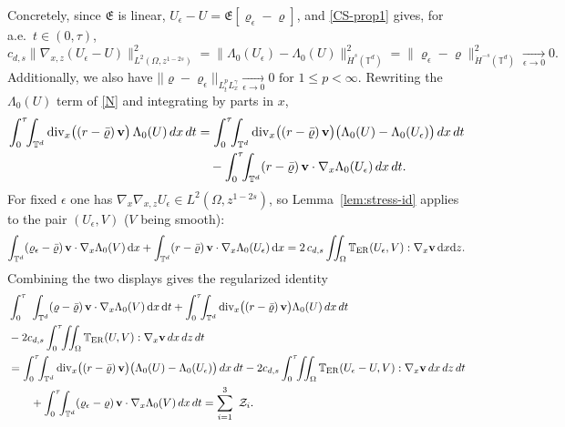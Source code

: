 \documentclass[12pt,a4paper,twoside]{article}
\newcommand{\vr}{\varrho}
\newcommand{\vv}{\vc{v}}
\newcommand{\vc}[1]{{\bf #1}}
\newcommand{\dx}{{\,\rm d} {x}}
\newcommand{\dt}{{\,\rm d} t }
\numberwithin{equation}{section}%
\newcommand{\T}{\mathbb{T}}
\newcommand{\dz}{{\rm d} z}
\newcommand{\Gradx}{\nabla_x}
\newcommand{\Gradxz}{\nabla_{x,z}}
\newcommand{\Divx}{\operatorname{div}_x}
\newcommand{\Lambdaz}{\Lambda_0}
\begin{document}
\begin{pf}
Concretely, since $\mathfrak E$ is linear, $U_\epsilon-U=\mathfrak E[\vr_\epsilon-\vr]$, and
\eqref{CS-prop1} gives, for a.e.\ $t\in(0,\tau)$,
\begin{equation}\label{eq:eps-energy}
	c_{d,s}\big\|\Gradxz(U_\epsilon-U)\big\|_{L^2(\Omega,z^{1-2s})}^2
	=\big\|\Lambdaz(U_\epsilon)-\Lambdaz(U)\big\|_{\dot H^{s}(\mathbb T^d)}^2
	=\big\|\vr_\epsilon-\vr\big\|_{\dot H^{-s}(\mathbb T^d)}^2
	\xrightarrow[\epsilon\to0]{}0 .
\end{equation}
Additionally, we also have $ 	|| \vr- \vr_\epsilon ||_{L^p_t L^\gamma_x}  	\xrightarrow[\epsilon\to0]{}0  \text{ for } 1\leq p<\infty $.
Rewriting the $\Lambdaz(U)$ term of \eqref{N} and integrating by parts in $x$,
\begin{align*}
	\int_0^\tau\!\!\int_{\mathbb T^d}\Divx\!\big((r-\bar\vr)\,\vv\big)\,\Lambdaz(U)\,dx\,dt
	&=\int_0^\tau\!\!\int_{\mathbb T^d}\Divx\!\big((r-\bar\vr)\,\vv\big)\big(\Lambdaz(U)-\Lambdaz(U_\epsilon)\big)\,dx\,dt\\
	&\quad-\int_0^\tau\!\!\int_{\mathbb T^d}(r-\bar\vr)\,\vv\cdot\Gradx\Lambdaz(U_\epsilon)\,dx\,dt .
\end{align*}
For fixed $\epsilon$ one has $\Gradx\Gradxz U_\epsilon\in L^2(\Omega,z^{1-2s})$, so
Lemma~\ref{lem:stress-id} applies to the pair $(U_\epsilon,V)$ ($V$ being smooth):
\begin{equation}\label{eq:polar-eps}
	\int_{\mathbb T^d}(\vr_\epsilon-\bar\vr)\,\vv\cdot\Gradx\Lambdaz(V) \dx
	+\int_{\mathbb T^d}(r-\bar\vr)\,\vv\cdot\Gradx\Lambdaz(U_\epsilon) \dx 
	=2\,c_{d,s}\iint_\Omega\T_{\rm ER}(U_\epsilon,V):\Gradx\vv \dx \dz.
\end{equation}
Combining the two displays gives the regularized identity
\begin{align}\label{stress-reg}
	&\int_0^\tau\ \int_{\mathbb T^d}(\vr-\bar\vr)\,\vv\cdot\Gradx\Lambdaz(V) \dx \dt 
	+\int_0^\tau\!\!\int_{\mathbb T^d}\Divx\!\big((r-\bar\vr)\,\vv\big)\Lambdaz(U)\,dx\,dt \nonumber\\ 
	&	-2c_{d,s}\int_0^\tau\!\!\iint_\Omega\T_{\rm ER}(U,V):\Gradx\vv\,dx\,dz\,dt\nonumber \\
	&=\int_0^\tau\!\!\int_{\mathbb T^d}\Divx\!\big((r-\bar\vr)\,\vv\big)\big(\Lambdaz(U)-\Lambdaz(U_\epsilon)\big)\,dx\,dt
	-2c_{d,s}\int_0^\tau\!\!\iint_\Omega\T_{\rm ER}(U_\epsilon-U,V):\Gradx\vv\,dx\,dz\,dt \nonumber \\
	&\qquad+\int_0^\tau\!\!\int_{\mathbb T^d}(\vr_\epsilon-\vr)\,\vv\cdot\Gradx\Lambdaz(V)\,dx\,dt = \sum_{i=1}^{3} \ \mathcal{Z}_i.
\end{align}

\end{pf}
\end{document}
